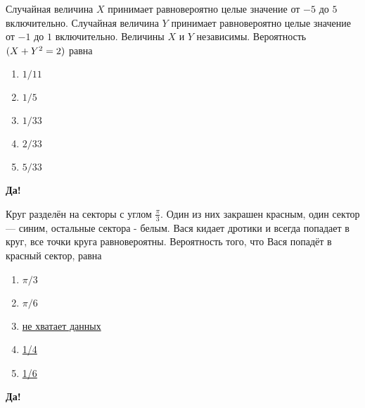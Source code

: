 \documentclass[t]{beamer}
\let\P\relax
\DeclareMathOperator{\P}{\mathbb{P}}
\begin{document}
 \begin{frame} \label{8-Yes} 
\begin{block}{8} 

  Случайная величина $X$ принимает равновероятно целые значение от $-5$ до $5$ включительно. Случайная величина $Y$ принимает равновероятно целые значение от $-1$ до $1$ включительно. Величины $X$ и $Y$ независимы. Вероятность $\P(X+Y^2=2)$ равна
  


 \end{block} 
\begin{enumerate} 
\item[] \hyperlink{8-Yes}{\beamergotobutton{} $1/11$}
\item[] \hyperlink{8-No}{\beamergotobutton{} $1/5$}
\item[] \hyperlink{8-No}{\beamergotobutton{} $1/33$}
\item[] \hyperlink{8-No}{\beamergotobutton{} $2/33$}
\item[] \hyperlink{8-No}{\beamergotobutton{} $5/33$}
\end{enumerate} 

 \textbf{Да!} 
 \hyperlink{9}{}\end{frame} 


 \begin{frame} \label{9-Yes} 
\begin{block}{9} 

Круг разделён на секторы с углом $\frac{\pi}{3}$. Один из них закрашен красным, один сектор — синим, остальные сектора - белым. Вася кидает дротики и всегда попадает в круг, все точки круга равновероятны. Вероятность того, что Вася попадёт в красный сектор, равна


 \end{block} 
\begin{enumerate} 
\item[] \hyperlink{9-No}{\beamergotobutton{} $\pi / 3$}
\item[] \hyperlink{9-No}{\beamergotobutton{} $\pi / 6$}
\item[] \hyperlink{9-No}{\beamergotobutton{} не хватает данных}
\item[] \hyperlink{9-No}{\beamergotobutton{} 1/4}
\item[] \hyperlink{9-Yes}{\beamergotobutton{} 1/6}
\end{enumerate} 

 \textbf{Да!} 
 \hyperlink{10}{}\end{frame} 
\end{document}
